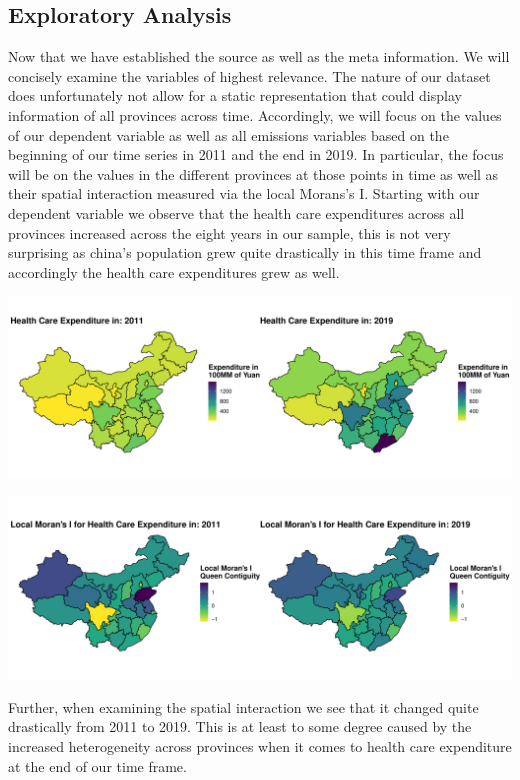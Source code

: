\documentclass[
]{article}
\begin{document}
	\subsection{Exploratory Analysis}
	Now that we have established the source as well as the meta information. We will concisely examine the variables of highest relevance. The nature of our dataset does unfortunately not allow for a static representation that could display information of all provinces across time. Accordingly, we will focus on the values of our dependent variable as well as all emissions variables based on the beginning of our time series in 2011 and the end in 2019. In particular, the focus will be on the values in the different provinces at those points in time as well as their spatial interaction measured via the local Morans's I. Starting with our dependent variable we observe that the health care expenditures across all provinces increased across the eight years in our sample, this is not very surprising as china's population grew quite drastically in this time frame and accordingly the health care expenditures grew as well.
	\begin{center}
		\includegraphics[width = 440pt]{Health_Care_Expenditures_comp.pdf} 
	\end{center}
	\begin{center}
		\includegraphics[width = 440pt]{Ii_Health_Care_Expenditures_comp.pdf} 
	\end{center}
	Further, when examining the spatial interaction we see that it changed quite drastically from 2011 to 2019. This is at least to some degree caused by the increased heterogeneity across provinces when it comes to health care expenditure at the end of our time frame.\\
\end{document}
